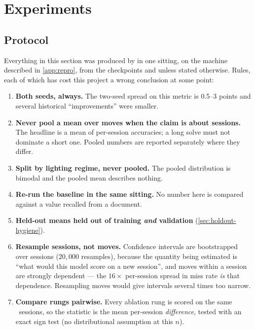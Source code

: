 \section{Experiments}
\label{sec:experiments}

\subsection{Protocol}

Everything in this section was produced by  in one
sitting, on the machine described in \cref{app:repro}, from the checkpoints
 and  unless stated
otherwise. Rules, each of which has cost this project a wrong conclusion at
some point:

\begin{enumerate}[leftmargin=1.4em,itemsep=2pt]
\item \textbf{Both seeds, always.} The two-seed spread on this metric is
0.5--3 points and several historical ``improvements'' were smaller.
\item \textbf{Never pool a mean over moves when the claim is about
sessions.} The headline is a mean of per-session accuracies; a long solve
must not dominate a short one. Pooled numbers are reported separately where
they differ.
\item \textbf{Split by lighting regime, never pooled.} The pooled
distribution is bimodal and the pooled mean describes nothing.
\item \textbf{Re-run the baseline in the same sitting.} No number here is
compared against a value recalled from a document.
\item \textbf{Held-out means held out of training \emph{and} validation}
(\cref{sec:holdout-hygiene}).
\item \textbf{Resample sessions, not moves.} Confidence intervals are
bootstrapped over sessions ($20{,}000$ resamples), because the quantity
being estimated is ``what would this model score on a new session'', and
moves within a session are strongly dependent --- the $16\times$
per-session spread in miss rate \emph{is} that dependence. Resampling moves
would give intervals several times too narrow.
\item \textbf{Compare rungs pairwise.} Every ablation rung is scored on the
same \NPaired\ sessions, so the statistic is the mean per-session
\emph{difference}, tested with an exact sign test (no distributional
assumption at this $n$).
\end{enumerate}

